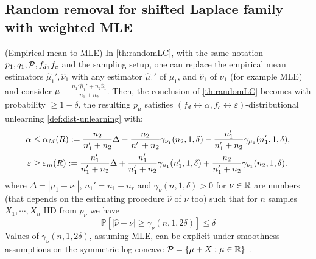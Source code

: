 \subsection{Random removal for shifted Laplace family with weighted MLE}
\begin{remark}(Empirical mean to MLE) In  \ref{th:randomLC}, with the same notation  $p_1,q_1, \mathcal{P}, f_d,f_c$ and the sampling setup, one can replace the empirical mean estimators $\hat{\mu}_1', \hat{\nu}_1$ with any estimator $\hat{\mu}_1'$ of $\mu_1$, and $\hat{\nu}_1$ of $\nu_1$ (for example MLE) and consider $\mu= \frac{n_1' \hat{\mu}_1' + n_2 \hat{\nu}_1}{n_1+n_2}$. Then, the conclusion of \ref{th:randomLC} becomes with probability $\geq 1 - \delta$, the resulting   $p_{\mu}$ satisfies $(f_d \leftrightarrow \alpha,f_c\leftrightarrow  \varepsilon)$-distributional unlearning \ref{def:dist-unlearning} with:
\begin{align*}
\alpha & \leq \alpha_M(R):=\frac{n_2}{n_1' + n_2} \Delta - \frac{n_2}{n_1' + n_2} \gamma_{\nu_1}(n_2, 1,\delta) - \frac{n_1'}{n_1' + n_2} \gamma_{\mu_1}(n_1',1,\delta) , \\
\varepsilon &\geq  \varepsilon_m(R):= \frac{n_1'}{n_1' + n_2}  \Delta + \frac{n_1'}{n_1' + n_2}  \gamma_{\mu_1}(n_1',1,\delta) + \frac{n_2}{n_1' + n_2}  \gamma_{\nu_1}(n_2, 1,\delta).
\end{align*}
where $\Delta = |\mu_1- \nu_1|$, $n_1'= n_1- n_r$ and $\gamma_{\nu}(n, 1, \delta)>0$ for $\nu\in \mathbb{R}$ are numbers (that depends on the estimating procedure $\hat{\nu}$ of $\nu$ too) such that for $n$ samples $X_1, \cdots, X_n$   IID from $p_{\nu}$ we have 
\begin{equation} \label{eq:MLEC}
    \mathbb{P}\left[|\hat{\nu} -\nu| \geq  \gamma_{\nu}(n,1, 2\delta)\right] \leq \delta 
\end{equation}
Values of $\gamma_{\nu}(n,1, 2\delta)$, assuming MLE, can be explicit under smoothness assumptions on the symmetric log-concave  $\mathcal{P}=\{\mu+X: \mu \in \mathbb{R}\}$ \citet{koltchinskii2023functional, gupta2022finite}. 
\end{remark}

